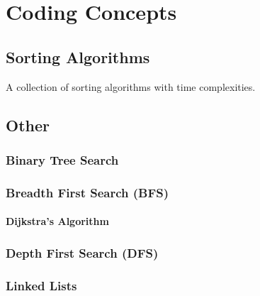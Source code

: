\chapter{Coding Concepts}
\label{coding}

\section{Sorting Algorithms}
\label{coding:sorts}

\begin{table}[H]
\centering
\begingroup
\renewcommand*{\arraystretch}{1}

\endgroup
\caption{
A collection of sorting algorithms with time complexities.
}
\label{tab:sorting_table}
\end{table}


\section{Other}
\label{coding:other}

\subsection{Binary Tree Search}
\label{coding:other:binary_tree_search}

\subsection{Breadth First Search (BFS)}
\label{coding:other:bfs}

\subsubsection{Dijkstra's Algorithm}
\label{coding:other:bfs:dijkstra}

\subsection{Depth First Search (DFS)}
\label{coding:other:dfs}

\subsection{Linked Lists}
\label{coding:other:lls}

